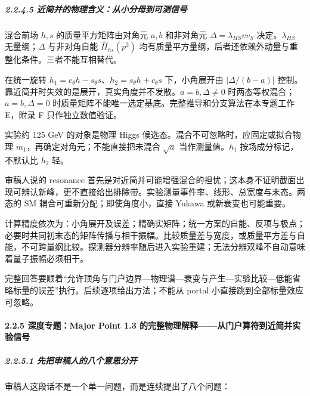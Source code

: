 \documentclass[
]{article}
\begin{document}
\subparagraph{2.2.4.5
近简并的物理含义：从小分母到可测信号}\label{ux8fd1ux7b80ux5e76ux7684ux7269ux7406ux542bux4e49ux4eceux5c0fux5206ux6bcdux5230ux53efux6d4bux4fe1ux53f7}

混合前场 \(h,s\) 的质量平方矩阵由对角元 \(a,b\) 和非对角元
\(\Delta=\lambda_{HS}vv_S\) 决定。\(\lambda_{HS}\) 无量纲；\(\Delta\)
与非对角自能 \(\widehat\Pi_{hs}(p^2)\)
均有质量平方量纲，后者还依赖外动量与重整化条件。三者不能互相替代。

在统一旋转 \(h_1=c_\theta h-s_\theta s\)、\(h_2=s_\theta h+c_\theta s\)
下，小角展开由 \(\lvert\Delta/(b-a)\rvert\)
控制。靠近简并时失效的是展开，真实角度并不发散。\(a=b,\Delta\ne0\)
时两态等权混合；\(a=b,\Delta=0\)
时质量矩阵不能唯一选定基底。完整推导和分支算法在本专题工作 E，附录 F
只作独立数值验证。

实验约 125 GeV 的对象是物理 Higgs
候选态。混合不可忽略时，应固定或拟合物理
\(m_1\)，再确定对角元；不能直接把未混合 \(\sqrt a\) 当作测量值。\(h_1\)
按场成分标记，不默认比 \(h_2\) 轻。

审稿人说的 resonance
首先是对近简并可能增强混合的担忧；这本身不证明截面出现可辨认新峰，更不直接给出排除带。实验测量事件率、线形、总宽度与末态。两态的
SM 耦合可重新分配；即使角度小，直接 Yukawa 或新衰变也可能重要。

计算精度依次为：小角展开及误差；精确实矩阵；统一方案的自能、反项与极点；必要时共同初末态的矩阵传播与相干振幅。比较质量差与宽度，或质量平方差与自能，不可跨量纲比较。探测器分辨率随后进入实验重建；无法分辨双峰不自动意味着量子振幅必须相干。

完整回答要顺着``允许顶角与门户边界---物理谱---衰变与产生---实验比较---低能省略标量的误差''执行。后续逐项给出方法；不能从
portal 小直接跳到全部标量效应可忽略。

\paragraph{2.2.5 深度专题：Major Point 1.3
的完整物理解释------从门户算符到近简并实验信号}\label{ux6df1ux5ea6ux4e13ux9898major-point-1.3-ux7684ux5b8cux6574ux7269ux7406ux89e3ux91caux4eceux95e8ux6237ux7b97ux7b26ux5230ux8fd1ux7b80ux5e76ux5b9eux9a8cux4fe1ux53f7}

\subparagraph{2.2.5.1
先把审稿人的八个意思分开}\label{ux5148ux628aux5ba1ux7a3fux4ebaux7684ux516bux4e2aux610fux601dux5206ux5f00}

审稿人这段话不是一个单一问题，而是连续提出了八个问题：
\end{document}
